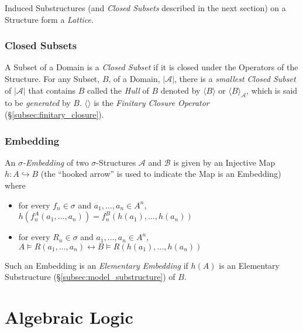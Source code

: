 \documentclass{article}
\begin{document}
Induced Substructures (and \emph{Closed Subsets} described in the next
section) on a Structure form a \emph{Lattice}.



\subsubsection{Closed Subsets}

A Subset of a Domain is a \emph{Closed Subset} if it is closed under
the Operators of the Structure. For any Subset, $B$, of a Domain,
$|\mathcal{A}|$, there is a \emph{smallest Closed Subset} of
$|\mathcal{A}|$ that contains $B$ called the \emph{Hull} of $B$
denoted by $\langle B \rangle$ or $\langle B \rangle_{\mathcal{A}}$,
which is said to be \emph{generated} by $B$. $\langle \rangle$ is the
\emph{Finitary Closure Operator} (\S\ref{subsec:finitary_closure}).



\subsubsection{Embedding}\label{subsec:sigma_embedding}


An \emph{$\sigma$-Embedding} of two $\sigma$-Structures $\mathcal{A}$
and $\mathcal{B}$ is given by an Injective Map $h: A \hookrightarrow
B$ (the ``hooked arrow'' is used to indicate the Map is an Embedding)
where
\begin{itemize}
\item for every $f_n \in \sigma$ and $a_1, \ldots, a_n \in A^n$,
  $h(f_{n}^A(a_1,\ldots,a_n)) = f_{n}^B(h(a_1),\ldots,h(a_n))$
\item for every $R_n \in \sigma$ and $a_1, \ldots, a_n \in A^n$, $A
  \vDash R(a_1, \ldots, a_n) \leftrightarrow B \vDash R(h(a_1),
  \ldots, h(a_n))$
\end{itemize}
Such an Embedding is an \emph{Elementary Embedding} if $h(A)$ is an
Elementary Substructure (\S\ref{subsec:model_substructure}) of $B$.



\section{Algebraic Logic}
\end{document}
